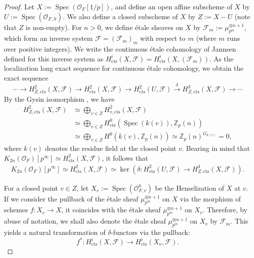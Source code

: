 \documentclass{article}
\numberwithin{equation}{section} %
\begin{document}
\begin{proof}
  Let $X := \operatorname{Spec}(\mathcal{O}_F[1/p])$, and define an open affine subscheme of $X$ by $U := \operatorname{Spec}(\mathcal{O}_{F,S})$. We also define a closed subscheme of $X$ by $Z := X - U$ (note that $Z$ is non-empty). For $n > 0$, we define étale sheaves on $X$ by $\mathscr{F}_{m} := \mu_{p^{m}}^{\otimes n+1}$, which form an inverse system $\mathscr{F} = (\mathscr{F}_{m})_m$ with respect to $m$ (where $m$ runs over positive integers). We write the continuous étale cohomology of Jannsen \cite{Jannsen} defined for this inverse system as $H^i_{\mathrm{cts}}(X,\mathscr{F}) = H^i_{\mathrm{cts}}(X,\left(\mathscr{F}_{m}\right))$. As the localization long exact sequence for continuous étale cohomology, we obtain the exact sequence
\[
  \cdots \longrightarrow H^2_{Z,\mathrm{cts}}(X,\mathscr{F}) \longrightarrow H^2_{\mathrm{cts}}(X,\mathscr{F}) \longrightarrow H^2_{\mathrm{cts}}(U,\mathscr{F}) \overset{\delta}{\longrightarrow} H^3_{Z,\mathrm{cts}}(X,\mathscr{F}) \longrightarrow \cdots
\]
By the Gysin isomorphism \cite[Theorem 3.17]{Jannsen}, we have
\begin{align*}
  H^2_{Z,\mathrm{cts}}(X,\mathscr{F}) &\simeq \bigoplus_{v \in Z} H^2_{v,\mathrm{cts}}(X,\mathscr{F}) \\ 
  &\simeq \bigoplus_{v \in Z} H^0_{\mathrm{cts}}(\operatorname{Spec}(k(v)),\mathbb{Z}_p(n)) \\  
  &\simeq \bigoplus_{v \in Z} H^0(k(v),\mathbb{Z}_p(n)) \simeq \mathbb{Z}_p(n)^{G_{k(v)}} = 0,
\end{align*}
where $k(v)$ denotes the residue field at the closed point $v$. Bearing in mind that $K_{2n}(\mathcal{O}_F)[p^\infty] \simeq H^2_{\mathrm{cts}}(X,\mathscr{F})$, it follows that
\begin{align}
    \label{dfjhyg8i9w34tj04ejtmjiop}
  K_{2n}(\mathcal{O}_F)[p^\infty] \simeq H^2_{\mathrm{cts}}(X,\mathscr{F}) \simeq \operatorname{ker}\left( \delta: H^2_{\mathrm{cts}}(U,\mathscr{F}) \longrightarrow H^3_{Z,\mathrm{cts}}(X,\mathscr{F})\right).
\end{align}

For a closed point $v \in Z$, let $X_v := \operatorname{Spec}(\mathcal{O}_{F,v}^h)$ be the Henselization of $X$ at $v$. If we consider the pullback of the étale sheaf $\mu_{p^m}^{\otimes n+1}$ on $X$ via the morphism of schemes $f: X_v \to X$, it coincides with the étale sheaf $\mu_{p^m}^{\otimes n+1}$ on $X_v$. Therefore, by abuse of notation, we shall also denote the étale sheaf $\mu_{p^m}^{\otimes n+1}$ on $X_v$ by $\mathscr{F}_{m}$. This yields a natural transformation of $\delta$-functors via the pullback:
\[
  f^* : H_{\mathrm{cts}}^i(X,\mathscr{F}) \longrightarrow H^i_{\mathrm{cts}}(X_v, \mathscr{F}).
\]


\end{proof}
\end{document}
